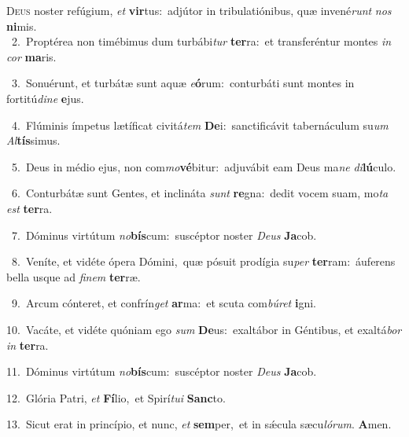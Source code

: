 \lettrine{\initial\textcolor{\initialcolor}{D}}{eus} noster refúgium, \textit{et} \textbf{vir}\-tus:~\star adjútor in tribulatiónibus, quæ invené\textit{runt} \textit{nos} \textbf{ni}\-mis.\\
{\numbfont\textcolor{\numbcolor}{~2.}}~Proptérea non timébimus dum turbábi\textit{tur} \textbf{ter}\-ra:~\star et transferéntur montes \textit{in} \textit{cor} \textbf{ma}\-ris.\par
{\numbfont\textcolor{\numbcolor}{~3.}}~Sonuérunt, et turbátæ sunt aquæ \textit{e}\-\textbf{ó}rum:~\star conturbáti sunt montes in fortitú\-\textit{di}\-\textit{ne} \textbf{e}\-jus.\par
{\numbfont\textcolor{\numbcolor}{~4.}}~Flúminis ímpetus lætíficat civitá\textit{tem} \textbf{De}\-i:~\star sanctificávit tabernáculum su\textit{um} \textit{Al}\-\textbf{tís}simus.\par
{\numbfont\textcolor{\numbcolor}{~5.}}~Deus in médio ejus, non com\-\textit{mo}\-\textbf{vé}bitur:~\star adjuvábit eam Deus ma\textit{ne} \textit{di}\-\textbf{lú}culo.\par
{\numbfont\textcolor{\numbcolor}{~6.}}~Conturbátæ sunt Gentes, et inclináta \textit{sunt} \textbf{re}\-gna:~\star dedit vocem suam, mo\textit{ta} \textit{est} \textbf{ter}\-ra.\par
{\numbfont\textcolor{\numbcolor}{~7.}}~Dóminus virtútum \textit{no}\-\textbf{bís}cum:~\star suscéptor noster \textit{De}\-\textit{us} \textbf{Ja}\-cob.\par
{\numbfont\textcolor{\numbcolor}{~8.}}~Veníte, et vidéte ópera Dómini,~\dagger quæ pósuit prodígia su\textit{per} \textbf{ter}\-ram:~\star áuferens bella usque ad \textit{fi}\-\textit{nem} \textbf{ter}\-ræ.\par
{\numbfont\textcolor{\numbcolor}{~9.}}~Arcum cónteret, et confrín\textit{get} \textbf{ar}\-ma:~\star et scuta com\-\textit{bú}\-\textit{ret} \textbf{i}\-gni.\par
{\numbfont\textcolor{\numbcolor}{10.}}~Vacáte, et vidéte quóniam ego \textit{sum} \textbf{De}\-us:~\star exaltábor in Géntibus, et exaltá\textit{bor} \textit{in} \textbf{ter}\-ra.\par
{\numbfont\textcolor{\numbcolor}{11.}}~Dóminus virtútum \textit{no}\-\textbf{bís}cum:~\star suscéptor noster \textit{De}\-\textit{us} \textbf{Ja}\-cob.\par
{\numbfont\textcolor{\numbcolor}{12.}}~Glória Patri, \textit{et} \textbf{Fí}\-lio,~\star et Spirí\-\textit{tu}\-\textit{i} \textbf{Sanc}\-to.\par
{\numbfont\textcolor{\numbcolor}{13.}}~Sicut erat in princípio, et nunc, \textit{et} \textbf{sem}\-per,~\star et in sǽcula sæcu\-\textit{ló}\-\textit{rum}. \textbf{A}\-men.\par
